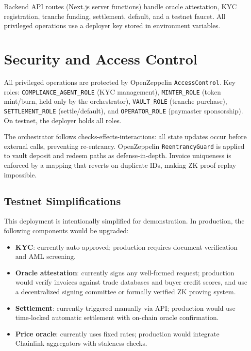 \documentclass[11pt,a4paper]{article}
\begin{document}
\noindent Backend API routes (Next.js server functions) handle oracle attestation, KYC
registration, tranche funding, settlement, default, and a testnet faucet. All privileged
operations use a deployer key stored in environment variables.

\section{Security and Access Control}

All privileged operations are protected by OpenZeppelin \texttt{AccessControl}.
Key roles: \texttt{COMPLIANCE\_AGENT\_ROLE} (KYC management), \texttt{MINTER\_ROLE}
(token mint/burn, held only by the orchestrator), \texttt{VAULT\_ROLE} (tranche purchase),
\texttt{SETTLEMENT\_ROLE} (settle/default), and \texttt{OPERATOR\_ROLE} (paymaster sponsorship).
On testnet, the deployer holds all roles.

The orchestrator follows checks-effects-interactions: all state updates occur before
external calls, preventing re-entrancy. OpenZeppelin \texttt{ReentrancyGuard} is applied
to vault deposit and redeem paths as defense-in-depth. Invoice uniqueness is enforced by
a mapping that reverts on duplicate IDs, making ZK proof replay impossible.

\subsection*{Testnet Simplifications}

This deployment is intentionally simplified for demonstration. In production, the following
components would be upgraded:

\begin{itemize}[leftmargin=2em, topsep=2pt, itemsep=1pt]
  \item \textbf{KYC}: currently auto-approved; production requires document verification and
    AML screening.
  \item \textbf{Oracle attestation}: currently signs any well-formed request; production would
    verify invoices against trade databases and buyer credit scores, and use a decentralized
    signing committee or formally verified ZK proving system.
  \item \textbf{Settlement}: currently triggered manually via API; production would use
    time-locked automatic settlement with on-chain oracle confirmation.
  \item \textbf{Price oracle}: currently uses fixed rates; production would integrate
    Chainlink aggregators with staleness checks.
\end{itemize}
\end{document}
